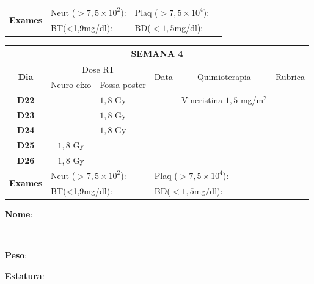 \documentclass[11pt,a4paper,oldfontcommands]{memoir}
\def\entrywithlabel[#1]#2{\parbox{#1}{{\small #2:} \hrulefill}}
\begin{document}
\begin{center}
\begin{table}[H]
\begin{tabular}{p{1cm}p{2cm}|p{2cm}|p{1cm}|p{4cm}|p{3cm}}
    \hline
    \multicolumn{1}{c|}{\multirow{2}{*}{\textbf{Exames}}}&\multicolumn{2}{l|}{Neut (\(>7,5\times10^2\)):}&\multicolumn{2}{l|}{Plaq (\(>7,5\times10^4\)):}&\\
    \cline{2-6}
    \multicolumn{1}{c|}{\multirow{2}{*}{{}}}&\multicolumn{2}{l|}{BT(<1,9mg/dl):}&\multicolumn{2}{l|}{BD(\(<1,5\)mg/dl):}&
    \\
    \hline
\end{tabular}
\end{table}
\begin{table}[H]
\begin{tabular}{p{1cm}p{2cm}|p{2cm}|p{1cm}|p{4cm}|p{3cm}}
	\hline
	\multicolumn{6}{c}{\textbf{SEMANA 4}}\\
\hline
    \multicolumn{1}{c|}{\multirow{2}{*}{\textbf{Dia}}}&\multicolumn{2}{c|}{Dose RT}&\multicolumn{1}{c|}{\multirow{2}{*}{Data}}&\multicolumn{1}{c|}{\multirow{2}{*}{Quimioterapia}}&\multicolumn{1}{c}{\multirow{2}{*}{Rubrica}} \\
    \cline{2-3}
    \multicolumn{1}{c|}{\multirow{1}{*}{}}&{Neuro-eixo}&{Fossa poster}&& \\
	\hline
	\multicolumn{1}{c|}{\multirow{1}{*}{\textbf{D22}}}&\multicolumn{1}{c|}{}&{\(1,8\) Gy}&&{Vincristina \(1,5\) mg/m\(^2\)}&\\
    \multicolumn{1}{c|}{\multirow{1}{*}{\textbf{D23}}}&\multicolumn{1}{c|}{}&{\(1,8\) Gy}&&{}&\\
    \multicolumn{1}{c|}{\multirow{1}{*}{\textbf{D24}}}&\multicolumn{1}{c|}{}&{\(1,8\) Gy}&&{}&\\
    \multicolumn{1}{c|}{\multirow{1}{*}{\textbf{D25}}}&\multicolumn{1}{c|}{\(1,8\) Gy}&&&{}&\\
    \multicolumn{1}{c|}{\multirow{1}{*}{\textbf{D26}}}&\multicolumn{1}{c|}{\(1,8\) Gy}&&&{}&\\
    \hline
    \multicolumn{1}{c|}{\multirow{2}{*}{\textbf{Exames}}}&\multicolumn{2}{l|}{Neut (\(>7,5\times10^2\)):}&\multicolumn{2}{l|}{Plaq (\(>7,5\times10^4\)):}&\\
    \cline{2-6}
    \multicolumn{1}{c|}{\multirow{2}{*}{{}}}&\multicolumn{2}{l|}{BT(<1,9mg/dl):}&\multicolumn{2}{l|}{BD(\(<1,5\)mg/dl):}&
    \\
    \hline
\end{tabular}
\end{table}
\pagebreak
\noindent
\entrywithlabel[1\hsize]{\textbf{Nome}}\hfill
\\[0.3cm]
\entrywithlabel[.45\hsize]{\textbf{Peso}}\hfill  \entrywithlabel[.45\hsize]{\textbf{Estatura}}


\end{center}
\end{document}
